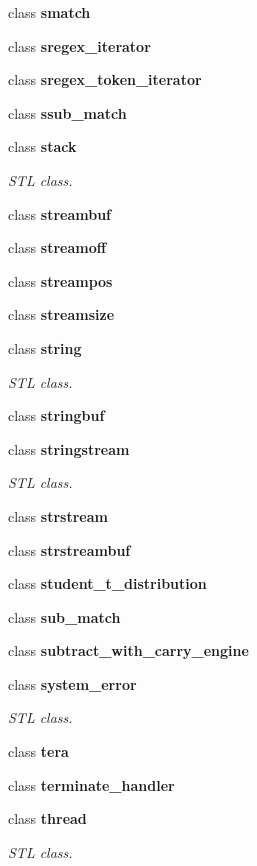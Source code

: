 \begin{DoxyCompactItemize}
class \textbf{ smatch}
\item 
class \textbf{ sregex\+\_\+iterator}
\item 
class \textbf{ sregex\+\_\+token\+\_\+iterator}
\item 
class \textbf{ ssub\+\_\+match}
\item 
class \textbf{ stack}
\begin{DoxyCompactList}\small\item\em S\+TL class. \end{DoxyCompactList}\item 
class \textbf{ streambuf}
\item 
class \textbf{ streamoff}
\item 
class \textbf{ streampos}
\item 
class \textbf{ streamsize}
\item 
class \textbf{ string}
\begin{DoxyCompactList}\small\item\em S\+TL class. \end{DoxyCompactList}\item 
class \textbf{ stringbuf}
\item 
class \textbf{ stringstream}
\begin{DoxyCompactList}\small\item\em S\+TL class. \end{DoxyCompactList}\item 
class \textbf{ strstream}
\item 
class \textbf{ strstreambuf}
\item 
class \textbf{ student\+\_\+t\+\_\+distribution}
\item 
class \textbf{ sub\+\_\+match}
\item 
class \textbf{ subtract\+\_\+with\+\_\+carry\+\_\+engine}
\item 
class \textbf{ system\+\_\+error}
\begin{DoxyCompactList}\small\item\em S\+TL class. \end{DoxyCompactList}\item 
class \textbf{ tera}
\item 
class \textbf{ terminate\+\_\+handler}
\item 
class \textbf{ thread}
\begin{DoxyCompactList}\small\item\em S\+TL class. \end{DoxyCompactList}\item 

\end{DoxyCompactItemize}
